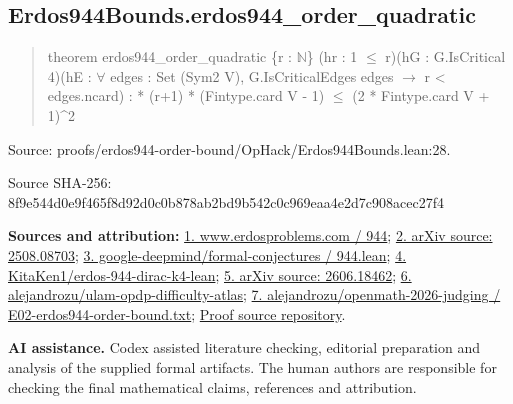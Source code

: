 \documentclass[11pt,a4paper]{article}
\begin{document}
\begin{samepage}
\subsection{Erdos944Bounds.erdos944\_order\_quadratic}
\begin{quote}\small\ttfamily theorem erdos944\_order\_quadratic \{r : \ensuremath{\mathbb{N}}\} (hr : 1 \ensuremath{\leq} r)\newline     (hG : G.IsCritical 4)\newline     (hE : \ensuremath{\forall} edges : Set (Sym2 V), G.IsCriticalEdges edges \ensuremath{\to} r < edges.ncard) : * (r+1) * (Fintype.card V - 1) \ensuremath{\leq} (2 * Fintype.card V + 1)\textasciicircum{}2\end{quote}
{\small Source: proofs/erdos944-order-bound/OpHack/Erdos944Bounds.lean:28.\par}

{\small Source SHA-256: 8f9e544d0e9f465f8d92d0c0b878ab2bd9b542c0c969eaa4e2d7c908acec27f4\par}

{\small\textbf{Sources and attribution:} \href{https://www.erdosproblems.com/944}{1. www.erdosproblems.com / 944}; \href{https://arxiv.org/html/2508.08703}{2. arXiv source: 2508.08703}; \href{https://github.com/google-deepmind/formal-conjectures/blob/main/FormalConjectures/ErdosProblems/944.lean}{3. google-deepmind/formal-conjectures / 944.lean}; \href{https://github.com/KitaKen1/erdos-944-dirac-k4-lean}{4. KitaKen1/erdos-944-dirac-k4-lean}; \href{https://arxiv.org/abs/2606.18462}{5. arXiv source: 2606.18462}; \href{https://github.com/alejandrozu/ulam-opdp-difficulty-atlas}{6. alejandrozu/ulam-opdp-difficulty-atlas}; \href{https://github.com/alejandrozu/openmath-2026-judging/blob/d0ed487f487fa7ec814ff705ab55249983fe8707/OpenMath-Judging/review/entries/E02-erdos944-order-bound.txt}{7. alejandrozu/openmath-2026-judging / E02-erdos944-order-bound.txt}; \href{https://github.com/alejandrozu/openmath-2026-judging}{Proof source repository}.\par}

\end{samepage}
{\small \textbf{AI assistance.} Codex assisted literature checking, editorial preparation and analysis of the supplied formal artifacts. The human authors are responsible for checking the final mathematical claims, references and attribution.\par}
\end{document}
